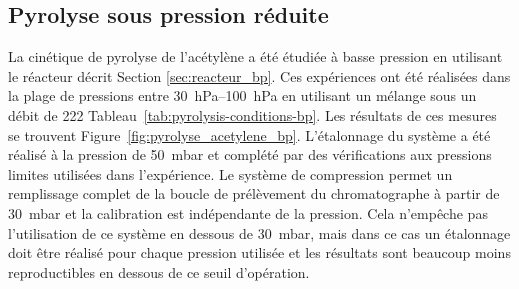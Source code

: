 \subsection{Pyrolyse sous pression réduite}
\label{sec:pyrolyse_acetylene_bp}

La cinétique de pyrolyse de l'acétylène a été étudiée à basse pression en utilisant le réacteur décrit Section \ref{sec:reacteur_bp}. Ces expériences ont été réalisées dans la plage de pressions entre \SIrange{30}{100}{\hecto\pascal} en utilisant un mélange  sous un débit de \SI{222}{\sccm} \textemdash{} Tableau~\ref{tab:pyrolysis-conditions-bp}. Les résultats de ces mesures se trouvent Figure~\ref{fig:pyrolyse_acetylene_bp}. L'étalonnage du système a été réalisé à la pression de \SI{50}{\milli\bar} et complété par des vérifications aux pressions limites utilisées dans l'expérience. Le système de compression permet un remplissage complet de la boucle de prélèvement du chromatographe à partir de \SI{30}{\milli\bar} et la calibration est indépendante de la pression. Cela n'empêche pas l'utilisation de ce système en dessous de \SI{30}{\milli\bar}, mais dans ce cas un étalonnage doit être réalisé pour chaque pression utilisée et les résultats sont beaucoup moins reproductibles en dessous de ce seuil d'opération. %

